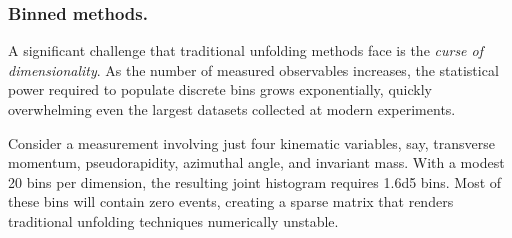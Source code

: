         \subsubsection{Binned methods.}
        \label{subsubsec:binned-methods}
            A significant challenge that traditional unfolding methods face is the \emph{curse of dimensionality}.
            As the number of measured observables increases, the statistical power required to populate discrete bins grows exponentially, quickly overwhelming even the largest datasets collected at modern experiments.
    
            Consider a measurement involving just four kinematic variables, say, transverse momentum, pseudorapidity, azimuthal angle, and invariant mass.
            With a modest 20 bins per dimension, the resulting joint histogram requires \num{1.6d5} bins.
            Most of these bins will contain zero events, creating a sparse matrix that renders traditional unfolding techniques numerically unstable.
            

